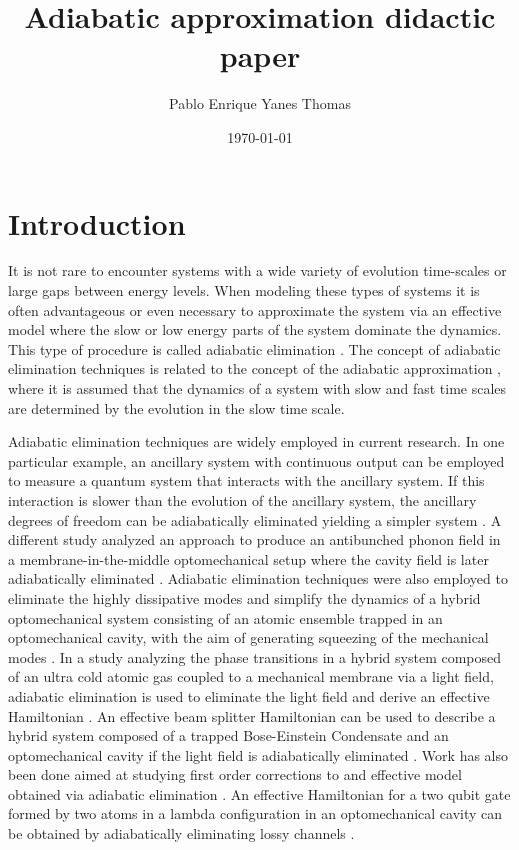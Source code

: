 \documentclass[12pt]{article}
\begin{document}
\title{Adiabatic approximation didactic paper}
\author{Pablo Enrique Yanes Thomas}
\date{\today}


\maketitle

\section{Introduction}
 
 It is not rare to encounter systems with a wide variety of evolution time-scales or large gaps between energy levels. When modeling these types of systems it is often advantageous or even necessary to approximate the system via an effective model where the slow or low energy parts of the system dominate the dynamics. This type of procedure is called adiabatic elimination \cite{GardinerStochasticMethods1983}. The concept of adiabatic elimination techniques is related to the concept of the adiabatic approximation \cite{HakenSynergetics2013}, where it is assumed that the dynamics of a system with slow and fast time scales are determined by the evolution in the slow time scale.
 

 Adiabatic elimination techniques are widely employed in current research. In one particular example, an ancillary system with continuous output can be employed to measure a quantum system that interacts with the ancillary system. If this interaction is slower than the evolution of the ancillary system, the ancillary degrees of freedom can be adiabatically eliminated yielding a simpler system \cite{CernotikAdiabatic2015}. A different study analyzed an approach to produce an antibunched phonon field in a membrane-in-the-middle optomechanical setup where the cavity field is later adiabatically eliminated \cite{SeokAntibunching2017}. Adiabatic elimination techniques were also employed to eliminate the highly dissipative modes and simplify the dynamics of a hybrid optomechanical system consisting of an atomic ensemble trapped in an optomechanical cavity, with the aim of generating squeezing of the mechanical modes \cite{BaiMirrorSqueezing2019}. In a study analyzing the phase transitions in a hybrid system composed of an ultra cold atomic gas coupled to a mechanical membrane via a light field, adiabatic elimination is used to eliminate the light field and derive an effective Hamiltonian \cite{MannPhaseTransitions2017}. An effective beam splitter Hamiltonian can be used to describe a hybrid system composed of a trapped Bose-Einstein Condensate and an optomechanical cavity if the light field is adiabatically eliminated \cite{SinghStateTransfer2012}. Work has also been done aimed at studying first order corrections to and effective model obtained via adiabatic elimination \cite{JiangAdiabaticCorrection2016}. An effective Hamiltonian for a two qubit gate formed by two atoms in a lambda configuration in an optomechanical cavity can be obtained by adiabatically eliminating lossy channels \cite{ChauhanSwapGate2019}.
 
\end{document}
